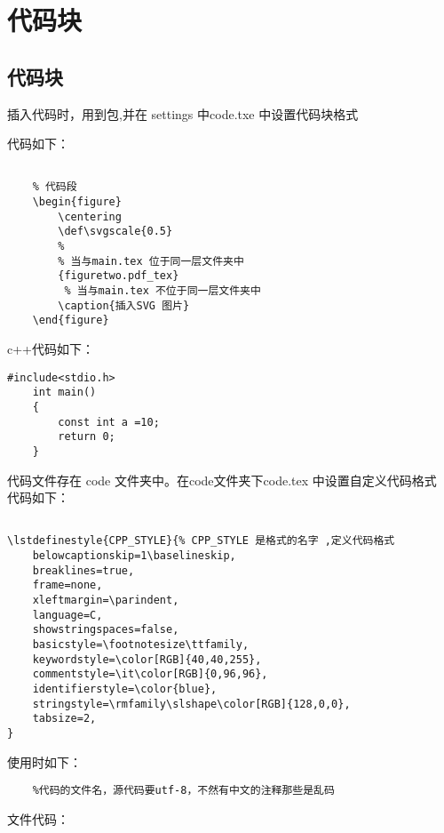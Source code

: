 

\chapter{代码块}
\section{代码块}



插入代码时，用到包,并在 settings 中code.txe 中设置代码块格式

代码如下：
\begin{lstlisting}[language={Tex}]
	
	% 代码段
	\begin{figure}
		\centering
		\def\svgscale{0.5}
		% 
		% 当与main.tex 位于同一层文件夹中
		{figuretwo.pdf_tex}
		 % 当与main.tex 不位于同一层文件夹中
		\caption{插入SVG 图片}
	\end{figure}

\end{lstlisting}

c++代码如下：
\begin{lstlisting}[language={[ANSI]C}]
	#include<stdio.h>
	int main()
	{
		const int a =10;
		return 0;
	}

\end{lstlisting}



代码文件存在 code 文件夹中。在code文件夹下code.tex 中设置自定义代码格式\\
代码如下：\\
\begin{lstlisting}[language={Tex}]
	
\lstdefinestyle{CPP_STYLE}{% CPP_STYLE 是格式的名字 ,定义代码格式
    belowcaptionskip=1\baselineskip,
    breaklines=true,
    frame=none,
    xleftmargin=\parindent,
    language=C,
    showstringspaces=false,
    basicstyle=\footnotesize\ttfamily,
    keywordstyle=\color[RGB]{40,40,255},
    commentstyle=\it\color[RGB]{0,96,96}, 
    identifierstyle=\color{blue},
    stringstyle=\rmfamily\slshape\color[RGB]{128,0,0}, 
    tabsize=2,
}

\end{lstlisting}

使用时如下：\\
\begin{lstlisting}[language={Tex}]
    %
    %代码的文件名，源代码要utf-8，不然有中文的注释那些是乱码
\end{lstlisting}
文件代码：

